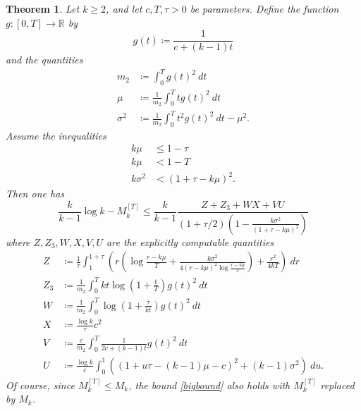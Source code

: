 \documentclass{bmcart}
\theoremstyle{plain}
\newtheorem{theorem}{Theorem}[section]
\theoremstyle{definition}
\newcommand\R{\mathbb{R}}
\begin{document}
\begin{theorem}\label{explicit}  Let $k \geq 2$, and let $c,T,\tau > 0$ be parameters.  Define the function $g: [0,T] \to \R$ by
\begin{equation}\label{g-def}
 g(t) \coloneqq \frac{1}{c + (k-1) t}
\end{equation}
and the quantities
\begin{align}
m_2 &\coloneqq \int_0^T g(t)^2\ dt \label{m2-def}\\
\mu &\coloneqq \frac{1}{m_2} \int_0^T t g(t)^2\ dt \label{mu-def}\\
\sigma^2 &\coloneqq \frac{1}{m_2} \int_0^T t^2 g(t)^2\ dt - \mu^2.\label{sigma-def}
\end{align}
Assume the inequalities
\begin{align}
k\mu &\leq 1-\tau \label{tau-bound}\\
k\mu &< 1-T \label{T-bound}\\
k\sigma^2 &< (1+\tau-k\mu)^2. \label{ksb}
\end{align}
Then one has
\begin{equation}\label{bigbound}
 \frac{k}{k-1} \log k - M_k^{[T]} \leq \frac{k}{k-1} \frac{Z + Z_3 + WX + VU}{(1+\tau/2) (1 - \frac{k\sigma^2}{(1+\tau-k\mu)^2})}
\end{equation}
where $Z, Z_3, W, X, V, U$ are the explicitly computable quantities
\begin{align}
Z &\coloneqq \frac{1}{\tau} \int_1^{1+\tau}\left( r\left(\log\frac{r-k\mu}{T} + \frac{k\sigma^2}{4(r-k\mu)^2 \log \frac{r-k\mu}{T}} \right) + \frac{r^2}{4kT}\right)\ dr\label{z-def}\\
Z_3 &\coloneqq \frac{1}{m_2} \int_0^T kt \log(1+\frac{t}{T}) g(t)^2\ dt \label{z3-def}\\
W &\coloneqq \frac{1}{m_2} \int_0^T \log(1+\frac{\tau}{kt}) g(t)^2\ dt\label{W-def}\\
X &\coloneqq \frac{\log k}{\tau} c^2 \label{X-def}\\
V &\coloneqq \frac{c}{m_2} \int_0^T \frac{1}{2c + (k-1)t} g(t)^2\ dt \label{V-def} \\
U &\coloneqq \frac{\log k}{c} \int_0^1 \left((1 + u\tau- (k-1)\mu- c)^2 + (k-1) \sigma^2\right)\ du.\label{U-def}
\end{align}
Of course, since $M_k^{[T]} \leq M_k$, the bound \eqref{bigbound} also holds with $M_k^{[T]}$ replaced by $M_k$.
\end{theorem}
\end{document}
